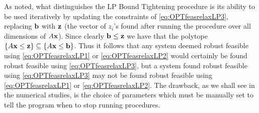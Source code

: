 As noted, what distinguishes the LP Bound Tightening procedure is its ability to be used iteratively by updating the constraints of \cref{eq:OPTfeasrelaxLP3}, replacing $\mathbf{b}$ with $\mathbf{z}$ (the vector of $z_i$'s found after running the procedure over all dimensions of $A\mathbf{x}$). 
Since clearly $\mathbf{b}\leq \mathbf{z}$ we have that the polytope $\{A\mathbf{x}\leq \mathbf{z}\}\subseteq\{A\mathbf{x}\leq \mathbf{b}\}$. 
Thus it follows that any system deemed robust feasible using \cref{eq:OPTfeasrelaxLP1} or \cref{eq:OPTfeasrelaxLP2} would certainly be found robust feasible using \cref{eq:OPTfeasrelaxLP3}, but a system found robust feasible using \cref{eq:OPTfeasrelaxLP3} may not be found robust feasible using \cref{eq:OPTfeasrelaxLP1} or \cref{eq:OPTfeasrelaxLP2}. 
The drawback, as we shall see in the numerical studies, is the choice of parameters which must be manually set to tell the program when to stop running procedures. 

